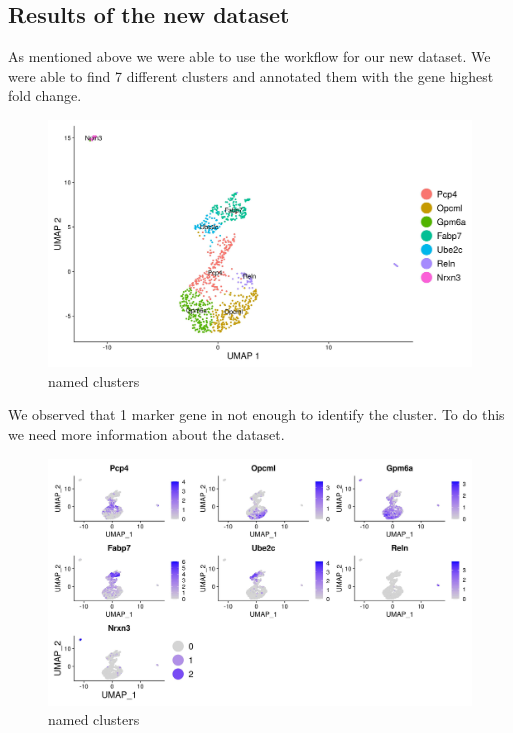 \documentclass[a4paper, 10pt]{scrartcl}
\begin{document}
\hypertarget{results-of-the-new-dataset}{%
\subsection{Results of the new
dataset}\label{results-of-the-new-dataset}}

As mentioned above we were able to use the workflow for our new dataset.
We were able to find 7 different clusters and annotated them with the
gene highest fold change.

\begin{figure}
\centering
\includegraphics[width=\textwidth]{../output/neurons_900_umap.jpg}
\caption{named clusters}
\end{figure}

We observed that 1 marker gene in not enough to identify the cluster. To
do this we need more information about the dataset.

\begin{figure}
\centering
\includegraphics[width=\textwidth]{../output/neurons_900_FeaturePlot.jpg}
\caption{named clusters}
\end{figure}
\end{document}
